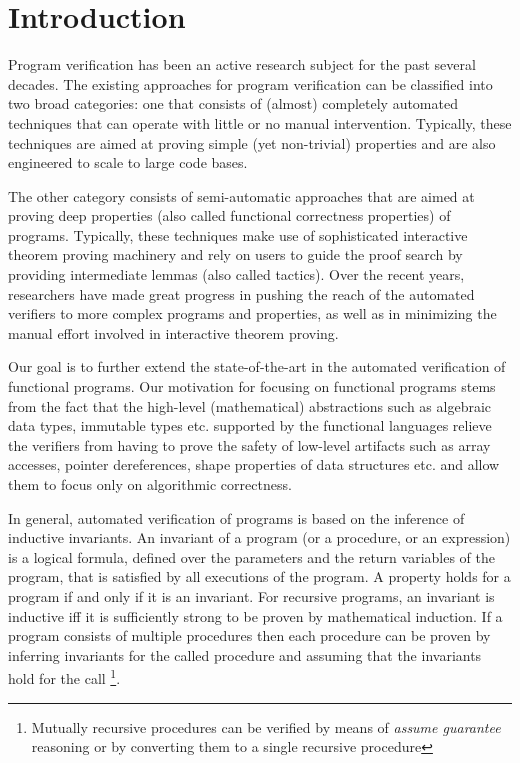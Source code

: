\section{Introduction}

Program verification has been an active research subject for the past several decades.
The existing approaches for program verification can be classified into two broad categories: one that 
consists of (almost) completely automated techniques that can operate with little or no manual
intervention. Typically, these techniques are aimed at proving simple (yet non-trivial) properties
and are also engineered to scale to large code bases. 

The other category consists of semi-automatic approaches that are aimed at proving deep properties 
(also called functional correctness properties) of programs. 
Typically, these techniques make use of sophisticated interactive theorem proving machinery
and rely on users to guide the proof search by providing intermediate lemmas (also called tactics).
Over the recent years, researchers have made great progress in pushing the reach of the 
automated verifiers to more complex programs and properties, as well as in minimizing the manual effort 
involved in interactive theorem proving. 

Our goal is to further extend the state-of-the-art in the automated verification of functional programs.
Our motivation for focusing on functional programs stems from the fact that the high-level (mathematical) abstractions 
such as algebraic data types, immutable types etc. supported by the functional languages relieve the verifiers 
from having to prove the safety of low-level artifacts such as array accesses, pointer dereferences,
shape properties of data structures etc. 
and allow them to focus only on algorithmic correctness.

In general, automated verification of programs is based on the inference of inductive invariants.
An invariant of a program (or a procedure, or an expression) is a logical formula, defined over the 
parameters and the return variables of the program, that is satisfied by all executions of the program. 
A property holds for a program if and only if it is an invariant. 
For recursive programs, an invariant is inductive iff it is sufficiently strong to be 
proven by mathematical induction. 
If a program consists of multiple procedures then each procedure can be proven by inferring invariants
for the called procedure and assuming that the invariants hold for the call 
\footnote{Mutually recursive procedures can be 
verified by means of \emph{assume guarantee} reasoning or by converting them 
to a single recursive procedure}.

